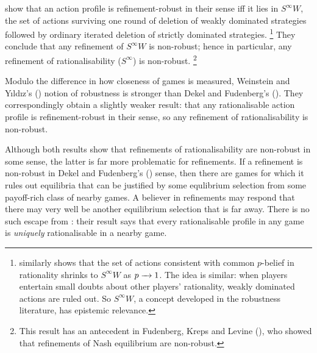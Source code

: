 \documentclass[11pt,letterpaper,reqno,oneside]{article}
\begin{document}
\textcite{DekelFudenberg1990} show that an action profile is refinement-robust in their sense iff it lies in $S^\infty W$, the set of actions surviving one round of deletion of weakly dominated strategies followed by ordinary iterated deletion of strictly dominated strategies.%
	\footnote{\textcite{Borgers1994} similarly shows that the set of actions consistent with common $p$-belief in rationality shrinks to $S^\infty W$ as $p \xrightarrow{\;\;\;} 1$. The idea is similar: when players entertain small doubts about other players' rationality, weakly dominated actions are ruled out. So $S^\infty W$, a concept developed in the robustness literature, has epistemic relevance.}
They conclude that any refinement of $S^\infty W$ is non-robust; hence in particular, any refinement of rationalisability ($S^\infty$) is non-robust.%
	\footnote{This result has an antecedent in Fudenberg, Kreps and Levine (\citeyear{FudenbergKrepsLevine1988}), who showed that refinements of Nash equilibrium are non-robust.}

Modulo the difference in how closeness of games is measured, Weinstein and Y{\i}ld{\i}z's (\citeyear{WeinsteinYildiz2007}) notion of robustness is stronger than Dekel and Fudenberg's (\citeyear{DekelFudenberg1990}). They correspondingly obtain a slightly weaker result: that any rationalisable action profile is refinement-robust in their sense, so any refinement of rationalisability is non-robust.

Although both results show that refinements of rationalisability are non-robust in some sense, the latter is far more problematic for refinements. If a refinement is non-robust in Dekel and Fudenberg's (\citeyear{DekelFudenberg1990}) sense, then there are games for which it rules out equilibria that can be justified by some equlibrium selection from some payoff-rich class of nearby games. A believer in refinements may respond that there may very well be another equilibrium selection that is far away. There is no such escape from \textcite{WeinsteinYildiz2007}: their result says that every rationalisable profile in any game is \emph{uniquely} rationalisable in a nearby game.







\end{document}
